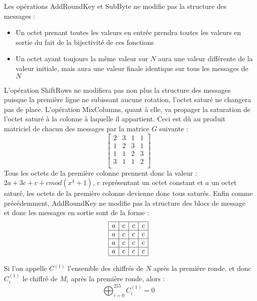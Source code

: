 \documentclass[a4paper,11pt]{article}
\begin{document}
Les opérations AddRoundKey et SubByte ne modifie pas la structure des messages :
\begin{itemize}
    \item Un octet prenant toutes les valeurs en entrée prendra toutes les valeurs en sortie du fait
        de la bijectivité de ces fonctions
    \item Un octet ayant toujours la même valeur sur $N$ aura une valeur différente de la valeur
        initiale, mais aura une valeur finale identique sur tous les messages de $N$
\end{itemize}
L'opération ShiftRows ne modifiera pas non plus la structure des messages puisque la première ligne
ne subissant aucune rotation, l'octet saturé ne changera pas de place. L'opération MixColumns, quant
à elle, va propager la saturation de l'octet saturé à la colonne à laquelle il appartient. Ceci est
dû au produit matriciel de chacun des messages par la matrice $G$ suivante : \begin{displaymath}
    \left [ 
        \begin{array}{cccc}
            2 & 3 & 1 & 1 \\
            1 & 2 & 3 & 1 \\
            1 & 1 & 2 & 3 \\
            3 & 1 & 1 & 2 \\
        \end{array}
    \right ]
\end{displaymath}
Tous les octets de la première colonne prennent donc la valeur : $ 2a + 3c + c + c mod (x^4 + 1)$,
$c$ représentant un octet constant et $a$ un octet saturé, les octets de la première colonne
devienne donc tous saturés.
Enfin comme précédemment, AddRoundKey ne modifie pas la structure des blocs de message et donc les
messages en sortie sont de la forme :
\begin{displaymath}
    \begin{array}{|c|c|c|c|} \hline
        a & c & c & c \\ \hline
        a & c & c & c \\ \hline
        a & c & c & c \\ \hline
        a & c & c & c \\ \hline
    \end{array}
\end{displaymath}

\begin{lemma*}
    Si l'on appelle $C^{(1)}$ l'ensemble des chiffrés de $N$ après la première ronde, et donc
    $C_i^{(1)}$ le chiffré de $M_i$ après la première ronde, alors :
    \begin{displaymath}
        \bigoplus_{i=0}^{255}C_i^{(1)} = 0
    \end{displaymath}
\end{lemma*}
\end{document}
